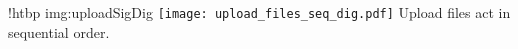 \namedfigure
{!htbp}
{img:uploadSigDig}
{\texttt{[image: upload\_files\_seq\_dig.pdf]}}
{Upload files act in sequential order.}
